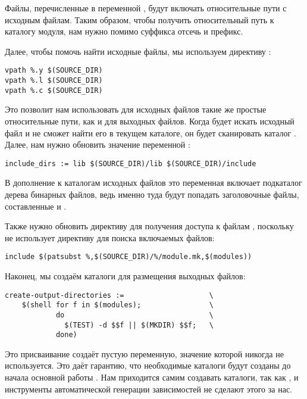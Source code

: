 Файлы, перечисленные в переменной , будут
включать относительные пути с исходным файлам. Таким образом, чтобы
получить относительный путь к каталогу модуля, нам нужно помимо
суффикса  отсечь и префикс.

Далее, чтобы помочь \GNUmake{} найти исходные файлы, мы используем
директиву :

{\footnotesize
\begin{verbatim}
vpath %.y $(SOURCE_DIR)
vpath %.l $(SOURCE_DIR)
vpath %.c $(SOURCE_DIR)
\end{verbatim}
}

Это позволит нам использовать для исходных файлов такие же простые
относительные пути, как и для выходных файлов. Когда \GNUmake{} будет
искать исходный файл и не сможет найти его в текущем каталоге, он
будет сканировать каталог . Далее, нам нужно
обновить значение переменной :

{\footnotesize
\begin{verbatim}
include_dirs := lib $(SOURCE_DIR)/lib $(SOURCE_DIR)/include
\end{verbatim}
}

В дополнение к каталогам исходных файлов это переменная включает
подкаталог  дерева бинарных файлов, ведь именно туда
будут попадать заголовочные файлы, составленные  и
.

Также нужно обновить директиву  для получения
доступа к файлам , поскольку \GNUmake{} не
использует директиву  для поиска включаемых файлов:

{\footnotesize
\begin{verbatim}
include $(patsubst %,$(SOURCE_DIR)/%/module.mk,$(modules))
\end{verbatim}
}

Наконец, мы создаём каталоги для размещения выходных файлов:

{\footnotesize
\begin{verbatim}
create-output-directories :=                    \
    $(shell for f in $(modules);                \
            do                                  \
              $(TEST) -d $$f || $(MKDIR) $$f;   \
            done)
\end{verbatim}
}

Это присваивание создаёт пустую переменную, значение которой никогда
не используется. Это даёт гарантию, что необходимые каталоги будут
созданы до начала основной работы \GNUmake{}. Нам приходится самим
создавать каталоги, так как ,  и
инструменты автоматической генерации зависимостей не сделают этого за
нас.

